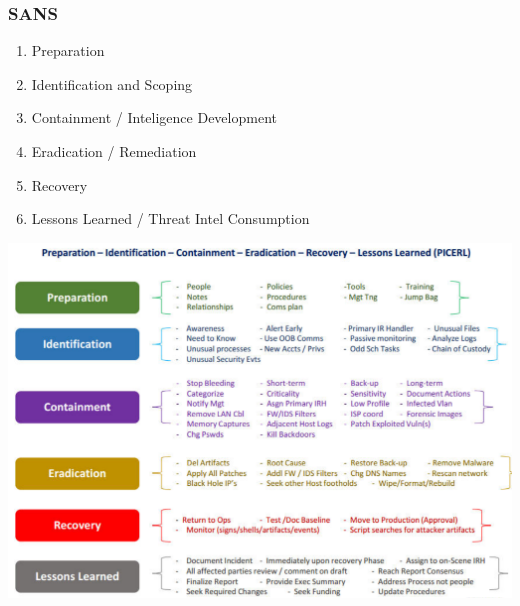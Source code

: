 \subsubsection{SANS}
\begin{enumerate}
    \item Preparation
    \item Identification and Scoping
    \item Containment / Inteligence Development
    \item Eradication / Remediation
    \item Recovery
    \item Lessons Learned / Threat Intel Consumption
\end{enumerate}

\begin{center}
    \includegraphics[width=1.0\linewidth]{./img/11-incident_response/sans_picerl}
    \vspace{-8pt}
\end{center}




